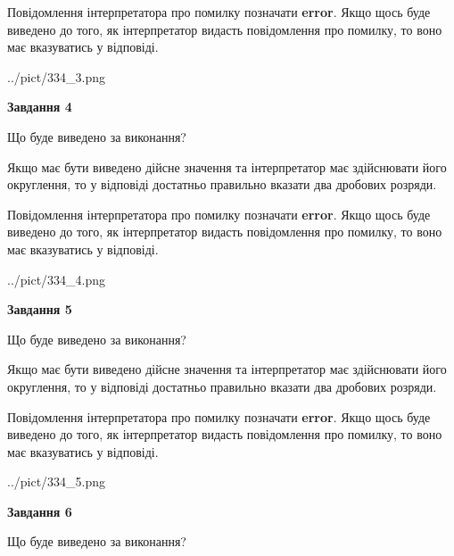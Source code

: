 \documentclass[12pt, ukrainian]{article}
\begin{document}
{\begin {Large}
Повідомлення інтерпретатора про помилку позначати \textbf{error}.
Якщо щось буде виведено до того, як інтерпретатор видасть повідомлення про помилку, 
то воно має вказуватись у відповіді. \par

\begin{center}
	{../pict/334_3.png}
\end{center}
\newpage

{\begin {center}\textbf{Завдання 4}\end {center}}\par
Що буде виведено за виконання? \par

Якщо має бути виведено дійсне значення та інтерпретатор має здійснювати його округлення, 
то у відповіді достатньо правильно вказати два дробових розряди.

Повідомлення інтерпретатора про помилку позначати \textbf{error}.
Якщо щось буде виведено до того, як інтерпретатор видасть повідомлення про помилку, 
то воно має вказуватись у відповіді. \par

\begin{center}
	{../pict/334_4.png}
\end{center}
\newpage

{\begin {center}\textbf{Завдання 5}\end {center}}\par
Що буде виведено за виконання? \par

Якщо має бути виведено дійсне значення та інтерпретатор має здійснювати його округлення, 
то у відповіді достатньо правильно вказати два дробових розряди.

Повідомлення інтерпретатора про помилку позначати \textbf{error}.
Якщо щось буде виведено до того, як інтерпретатор видасть повідомлення про помилку, 
то воно має вказуватись у відповіді. \par

\begin{center}
	{../pict/334_5.png}
\end{center}
\newpage

{\begin {center}\textbf{Завдання 6}\end {center}}\par
Що буде виведено за виконання? \par


\end{Large}}
\end{document}
